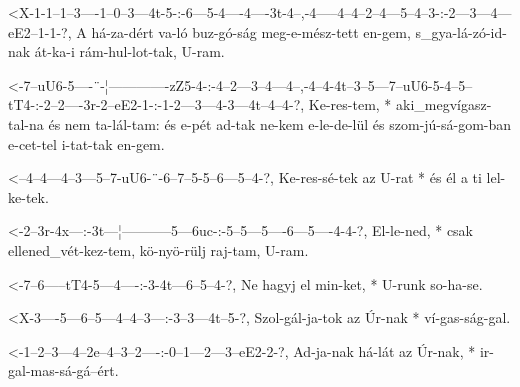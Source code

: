 
  {<X-1-1--1--3----1--0--3---4t-5-:-6---5-4----4----3t-4--,-4-----4--4--2--4---5--4--3-:-2---3---4---eE2--1-1-?,}
  {   A há-za-dért va-ló buz-gó-ság meg-e-mész-tett en-gem, s_gya-lá-zó-id-nak át-ka-i   rám-hul-lot-tak, U-ram. }

  {<-7--uU6-5----¨-¦-------------zZ5-4-:-4--2---3--4---4--,-4--4-4t--3--5---7--uU6-5-4--5--tT4-:-2--2----3r-2--eE2-1-:-1-2---3---4-3---4t--4--4-?,}
  {  Ke-res-tem, * aki_megvígasz-tal-na  és nem ta-lál-tam: és e-pét ad-tak ne-kem e-le-de-lül   és szom-jú-sá-gom-ban e-cet-tel i-tat-tak en-gem.}

  {<--4--4---4--3---5--7-uU6-¨-6--7--5-5--6---5--4-?,}
  {   Ke-res-sé-tek az U-rat * és él a ti lel-ke-tek.}



  {<-2--3r-4x---:-3t---¦-----------5---6uc-:-5--5---5----6---5----4-4-?,}
  {  El-le-ned, * csak ellened_vét-kez-tem,  kö-nyö-rülj raj-tam, U-ram.}

  {<-7--6-----tT4-5---4----:-3-4t---6--5--4-?,}
  {  Ne hagyj el  min-ket, * U-runk so-ha-se.}

  {<X-3----5---6--5---4--4--3---:-3--3---4t--5-?,}
  {   Szol-gál-ja-tok az Úr-nak * ví-gas-ság-gal.}




  {<-1--2--3---4--2e--4--3--2----:-0--1---2---3--eE2-2-?,}
  {  Ad-ja-nak há-lát az Úr-nak, * ir-gal-mas-sá-gá--ért.}

